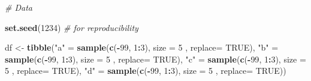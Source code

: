 \documentclass[
]{book}
\newenvironment{Shaded}{\begin{snugshade}}{\end{snugshade}}
\newcommand{\CommentTok}[1]{\textcolor[rgb]{0.56,0.35,0.01}{\textit{#1}}}
\newcommand{\DataTypeTok}[1]{\textcolor[rgb]{0.13,0.29,0.53}{#1}}
\newcommand{\DecValTok}[1]{\textcolor[rgb]{0.00,0.00,0.81}{#1}}
\newcommand{\KeywordTok}[1]{\textcolor[rgb]{0.13,0.29,0.53}{\textbf{#1}}}
\newcommand{\NormalTok}[1]{#1}
\newcommand{\OperatorTok}[1]{\textcolor[rgb]{0.81,0.36,0.00}{\textbf{#1}}}
\newcommand{\OtherTok}[1]{\textcolor[rgb]{0.56,0.35,0.01}{#1}}
\newcommand{\StringTok}[1]{\textcolor[rgb]{0.31,0.60,0.02}{#1}}
\begin{document}
\begin{Shaded}
\begin{Highlighting}[]
\CommentTok{\# Data}

\KeywordTok{set.seed}\NormalTok{(}\DecValTok{1234}\NormalTok{) }\CommentTok{\# for reproducibility }

\NormalTok{df \textless{}{-}}\StringTok{ }\KeywordTok{tibble}\NormalTok{(}\StringTok{"a"}\NormalTok{ =}\StringTok{ }\KeywordTok{sample}\NormalTok{(}\KeywordTok{c}\NormalTok{(}\OperatorTok{{-}}\DecValTok{99}\NormalTok{, }\DecValTok{1}\OperatorTok{:}\DecValTok{3}\NormalTok{), }\DataTypeTok{size =} \DecValTok{5}\NormalTok{ , }\DataTypeTok{replace=} \OtherTok{TRUE}\NormalTok{),}
             \StringTok{"b"}\NormalTok{ =}\StringTok{ }\KeywordTok{sample}\NormalTok{(}\KeywordTok{c}\NormalTok{(}\OperatorTok{{-}}\DecValTok{99}\NormalTok{, }\DecValTok{1}\OperatorTok{:}\DecValTok{3}\NormalTok{), }\DataTypeTok{size =} \DecValTok{5}\NormalTok{ , }\DataTypeTok{replace=} \OtherTok{TRUE}\NormalTok{),}
             \StringTok{"c"}\NormalTok{ =}\StringTok{ }\KeywordTok{sample}\NormalTok{(}\KeywordTok{c}\NormalTok{(}\OperatorTok{{-}}\DecValTok{99}\NormalTok{, }\DecValTok{1}\OperatorTok{:}\DecValTok{3}\NormalTok{), }\DataTypeTok{size =} \DecValTok{5}\NormalTok{ , }\DataTypeTok{replace=} \OtherTok{TRUE}\NormalTok{),}
             \StringTok{"d"}\NormalTok{ =}\StringTok{ }\KeywordTok{sample}\NormalTok{(}\KeywordTok{c}\NormalTok{(}\OperatorTok{{-}}\DecValTok{99}\NormalTok{, }\DecValTok{1}\OperatorTok{:}\DecValTok{3}\NormalTok{), }\DataTypeTok{size =} \DecValTok{5}\NormalTok{ , }\DataTypeTok{replace=} \OtherTok{TRUE}\NormalTok{))}
\end{Highlighting}
\end{Shaded}

\begin{Shaded}
\end{Shaded}
\end{document}
